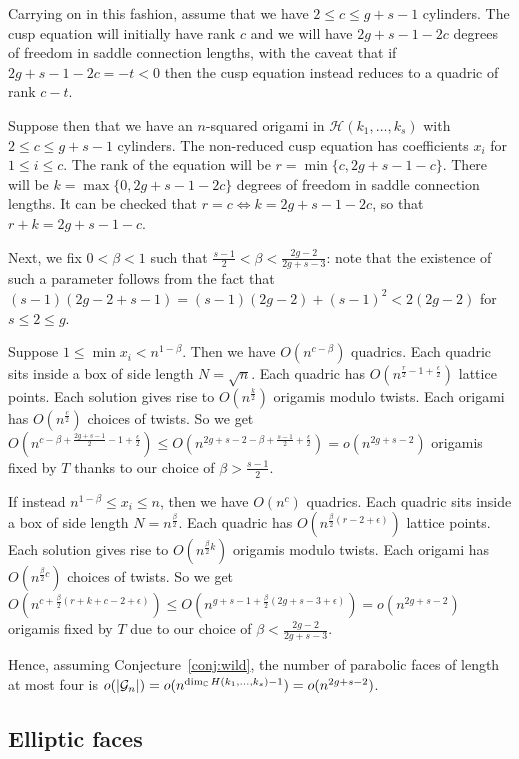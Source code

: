 \documentclass[a4paper,11pt]{amsart}
\numberwithin{equation}{section}
\numberwithin{figure}{section}
\numberwithin{table}{section}
\newcommand{\calH}{\mathcal{H}}
\newcommand{\C}{\mathbb{C}}
\begin{document}
Carrying on in this fashion, assume that we have $2\leq c\leq g+s-1$ cylinders. The cusp equation will initially have rank $c$ and we will have $2g+s-1-2c$ degrees of freedom in saddle connection lengths, with the caveat that if $2g+s-1-2c = -t < 0$ then the cusp equation instead reduces to a quadric of rank $c-t$.

Suppose then that we have an $n$-squared origami in $\calH(k_1,\ldots,k_s)$ with $2\leq c\leq g+s-1$ cylinders. The non-reduced cusp equation has coefficients $x_{i}$ for $1\leq i \leq c$. The rank of the equation will be $r = \min\{c,2g+s-1-c\}$. There will be $k = \max\{0,2g+s-1-2c\}$ degrees of freedom in saddle connection lengths. It can be checked that $r = c \Leftrightarrow k = 2g+s-1-2c$, so that $r+k = 2g+s-1-c$.

Next, we fix $0<\beta<1$ such that $\frac{s-1}{2}<\beta<\frac{2g-2}{2g+s-3}$: note that the existence of such a parameter follows from the fact that $(s-1)(2g-2+s-1) = (s-1)(2g-2)+(s-1)^2 < 2(2g-2)$ for $s\leq 2\leq g$.

Suppose $1\leq \min x_{i}<n^{1-\beta}$. Then we have $O(n^{c-\beta})$ quadrics. Each quadric sits inside a box of side length $N = \sqrt{n}$. Each quadric has $O(n^{\frac{r}{2}-1+\frac{\epsilon}{2}})$ lattice points. Each solution gives rise to $O(n^{\frac{k}{2}})$ origamis modulo twists. Each origami has $O(n^{\frac{c}{2}})$ choices of twists. So we get $O(n^{c-\beta+\frac{2g+s-1}{2}-1+\frac{\epsilon}{2}}) \leq O(n^{2g+s-2-\beta+\frac{s-1}{2}+\frac{\epsilon}{2}}) = o(n^{2g+s-2})$ origamis fixed by $T$ thanks to our choice of $\beta>\frac{s-1}{2}$.

If instead $n^{1-\beta}\leq x_{i}\leq n$, then we have $O(n^c)$ quadrics. Each quadric sits inside a box of side length $N = n^{\frac{\beta}{2}}$. Each quadric has $O(n^{\frac{\beta}{2}(r-2+\epsilon)})$ lattice points. Each solution gives rise to $O(n^{\frac{\beta}{2}k})$ origamis modulo twists. Each origami has $O(n^{\frac{\beta}{2}c})$ choices of twists. So we get $O(n^{c+\frac{\beta}{2}(r+k+c-2+\epsilon)}) \leq O(n^{g+s-1+\frac{\beta}{2}(2g+s-3+\epsilon)}) = o(n^{2g+s-2})$ origamis fixed by $T$ due to our choice of $\beta<\frac{2g-2}{2g+s-3}$.

Hence, assuming Conjecture~\ref{conj:wild}, the number of parabolic faces of length at most four is $o(|\mathcal{G}_{n}|) = o(n^{\dim_\C\mathcal\calH(k_1,\ldots,k_s) -1}) = o(n^{2g+s-2})$.

\subsection{Elliptic faces}\label{subsec:gen-ells}
\end{document}
